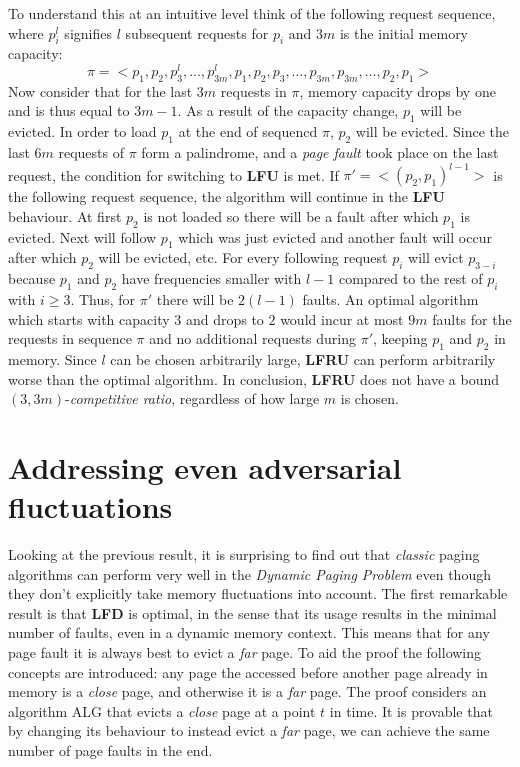 To understand this at an intuitive level think of the following request
sequence, where $p_i^l$ signifies $l$ subsequent requests for $p_i$ and $3m$ is
the initial memory capacity: $$\pi=<p_1, p_2, p_3^l, \dots, p_{3m}^l, p_1, p_2,
p_3, \dots, p_{3m}, p_{3m}, \dots, p_2, p_1>$$ Now consider that for the last
$3m$ requests in $\pi$, memory capacity drops by one and is thus equal to $3m -
1$. As a result of the capacity change, $p_1$ will be evicted. In order to load
$p_1$ at the end of sequencd $\pi$, $p_2$ will be evicted. Since the last $6m$
requests of $\pi$ form a palindrome, and a \emph{page fault} took place on the
last request, the condition for switching to \textbf{LFU} is
met. If $\pi'=<(p_2, p_1)^{l-1}>$ is the following request sequence, the
algorithm will continue in the \textbf{LFU} behaviour. At first $p_2$ is not
loaded so there will be a fault after which $p_1$ is evicted. Next will follow
$p_1$ which was just evicted and another fault will occur after which $p_2$
will be evicted, etc. For every following request $p_i$ will evict $p_{3-i}$
because $p_1$ and $p_2$ have frequencies smaller with $l-1$ compared to the
rest of $p_i$ with $i \ge 3$. Thus, for $\pi'$ there will be $2(l -1)$ faults.
An optimal algorithm which starts with capacity $3$ and drops to $2$ would
incur at most $9m$ faults for the requests in sequence $\pi$ and no additional
requests during $\pi'$, keeping $p_1$ and $p_2$ in memory. Since $l$ can be
chosen arbitrarily large, \textbf{LFRU} can perform arbitrarily worse than the
optimal algorithm. In conclusion, \textbf{LFRU} does not have a bound $(3,
3m)$-\emph{competitive ratio}, regardless of how large $m$ is chosen.


\section*{Addressing even adversarial fluctuations \cite{peserico2013paging1114}}

Looking at the previous result, it is surprising to find out that
\emph{classic} paging algorithms can perform very well in the \emph{Dynamic
Paging Problem} even though they don't explicitly take memory fluctuations into
account. The first remarkable result is that \textbf{LFD} is optimal, in the
sense that its usage results in the minimal number of faults, even in a dynamic
memory context. This means that for any page fault it is always best to evict a
\emph{far} page. To aid the proof the following concepts are introduced: any page
the accessed before another page already in memory is a \emph{close} page, and
otherwise it is a \emph{far} page. The proof considers an algorithm ALG that
evicts a \emph{close} page at a point $t$ in time. It is provable that by
changing its behaviour to instead evict a \emph{far} page, we can achieve the
same number of page faults in the end.

